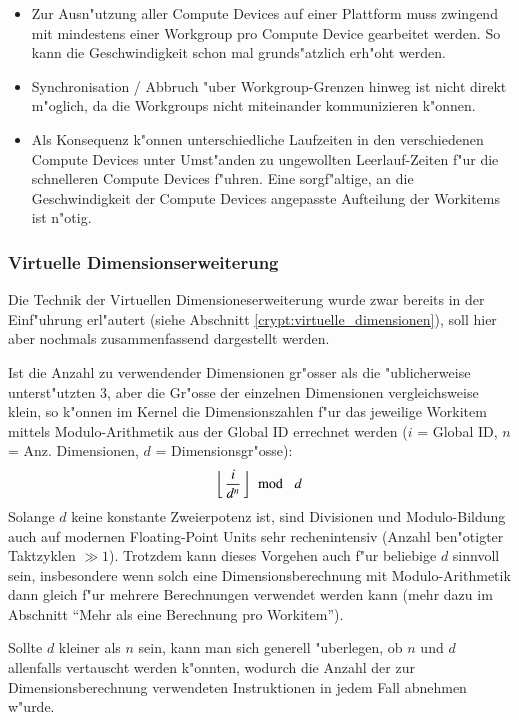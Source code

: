 \begin{refsection}
\begin{itemize}
 \item Zur Ausn"utzung aller Compute Devices auf einer Plattform
       muss zwingend mit mindestens einer Workgroup pro Compute Device
       gearbeitet werden. So kann die Geschwindigkeit schon mal 
       grunds"atzlich erh"oht werden.
 \item Synchronisation / Abbruch "uber Workgroup-Grenzen hinweg ist 
       nicht direkt m"oglich, da die Workgroups nicht miteinander kommunizieren
			 k"onnen.
 \item Als Konsequenz k"onnen unterschiedliche Laufzeiten in den verschiedenen
			 Compute Devices unter Umst"anden zu ungewollten Leerlauf-Zeiten f"ur die
			 schnelleren Compute Devices f"uhren. Eine sorgf"altige, an die
			 Geschwindigkeit der Compute Devices angepasste Aufteilung der Workitems ist
			 n"otig.
\end{itemize}

\subsubsection{Virtuelle Dimensionserweiterung}

Die Technik der Virtuellen Dimensioneserweiterung wurde zwar bereits in der
Einf"uhrung erl"autert (siehe Abschnitt \ref{crypt:virtuelle_dimensionen}), soll
hier aber nochmals zusammenfassend dargestellt werden.

Ist die Anzahl zu verwendender Dimensionen gr"osser als die "ublicherweise
unterst"utzten 3, aber die Gr"osse der einzelnen Dimensionen vergleichsweise
klein, so k"onnen im Kernel die Dimensionszahlen f"ur das jeweilige Workitem
mittels Modulo-Arithmetik aus der Global ID errechnet werden ($i$ = Global ID,
$n$ = Anz.  Dimensionen, $d$ = Dimensionsgr"osse):
\[
	\left\lfloor\,\frac{i}{d^n}\,\right\rfloor\! \mod\enskip d
\]
Solange $d$ keine konstante Zweierpotenz ist, sind Divisionen und Modulo-Bildung
auch auf modernen Floating-Point Units sehr rechenintensiv (Anzahl ben"otigter
Taktzyklen $ \gg 1 $). Trotzdem kann dieses Vorgehen auch f"ur beliebige $d$
sinnvoll sein, insbesondere wenn solch eine Dimensionsberechnung mit
Modulo-Arithmetik dann gleich f"ur mehrere Berechnungen verwendet werden kann
(mehr dazu im Abschnitt ``Mehr als eine Berechnung pro Workitem'').

Sollte $d$ kleiner als $n$ sein, kann man sich generell "uberlegen, ob $n$ und
$d$ allenfalls vertauscht werden k"onnten, wodurch die Anzahl der zur
Dimensionsberechnung verwendeten Instruktionen in jedem Fall abnehmen w"urde.


\end{refsection}

